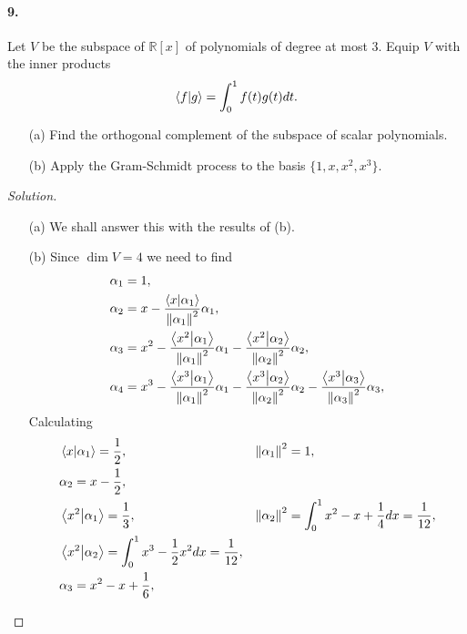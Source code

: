 \documentclass{article}
\theoremstyle{plain}
\theoremstyle{definition}
\theoremstyle{remark}
\renewcommand{\Re}{\mathbb{R}}
\renewcommand{\dd}{d}
\begin{document}
    \paragraph{9.}
    Let $V$ be the subspace of $\Re[x]$ of polynomials of degree at most 3. Equip $V$ with the inner products
    $$\bra{f}\ket{g} = \int_0^1 f(t)g(t)dt.$$
    \begin{itemize}
      \item[(a)] Find the orthogonal complement of the subspace of scalar polynomials.
      \item[(b)] Apply the Gram-Schmidt process to the basis $\{1,x,x^2,x^3\}$.
    \end{itemize}
      \begin{proof}[Solution]$ $
        \begin{itemize}
          \item[(a)] We shall answer this with the results of (b).
          \item[(b)] Since $\dim V = 4$ we need to find
            \begin{align*}
              &\alpha_1 = 1,\\
              &\alpha_2 = x - \frac{\braket{x}{\alpha_1}}{\norm{\alpha_1}^2} \alpha_1,\\
              &\alpha_3 = x^2 - \frac{\braket{x^2}{\alpha_1}}{\norm{\alpha_1}^2} \alpha_1- \frac{\braket{x^2}{\alpha_2}}{\norm{\alpha_2}^2} \alpha_2,\\
              &\alpha_4 = x^3 - \frac{\braket{x^3}{\alpha_1}}{\norm{\alpha_1}^2} \alpha_1 - \frac{\braket{x^3}{\alpha_2}}{\norm{\alpha_2}^2} \alpha_2 - \frac{\braket{x^3}{\alpha_3}}{\norm{\alpha_3}^2} \alpha_3,
            \end{align*}
            Calculating
            \begin{align*}
              &\braket{x}{\alpha_1} = \frac{1}{2},                                               &&   \norm{\alpha_1}^2 = 1 , \\
              &\alpha_2 = x-\frac{1}{2},                                                         &&   \\
              &\braket{x^2}{\alpha_1} = \frac{1}{3},                                              &&   \norm{\alpha_2}^2 = \int_0^1 x^2 - x + \frac{1}{4}  \dd x =\frac{1}{12},           \\
              &\braket{x^2}{\alpha_2} =  \int_0^1 x^3 - \frac{1}{2}x^2 \dd x =\frac{1}{12},       &&   \\
              & \alpha_3 = x^2 - x + \frac{1}{6},                                                &&   \\

\end{align*}
\end{itemize}
\end{proof}
\end{document}
